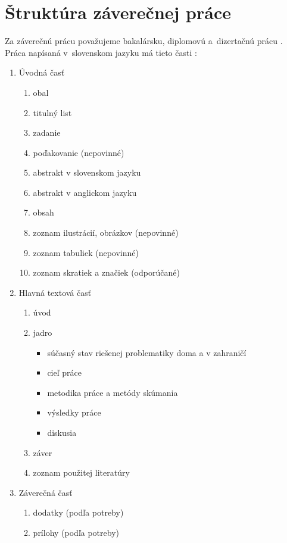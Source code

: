 \section{Štruktúra záverečnej práce}\label{sec:StrukturaPrace}
Za záverečnú prácu považujeme bakalársku, diplomovú
a~dizertačnú prácu \cite{zakon1312002}.
Práca napísaná v~slovenskom jazyku má tieto časti \cite{vyhlaska2332011, usmernenie562011}:
\begin{enumerate}
    \item Úvodná časť
    \begin{enumerate}
        \item obal
        \item titulný list
        \item zadanie
        \item poďakovanie (nepovinné)
        \item abstrakt v slovenskom jazyku
        \item abstrakt v anglickom jazyku
        \item obsah
        \item zoznam ilustrácií, obrázkov (nepovinné)
        \item zoznam tabuliek (nepovinné)
        \item zoznam skratiek a značiek (odporúčané)
    \end{enumerate}
    \item Hlavná textová časť
    \begin{enumerate}
        \item úvod
        \item jadro
        \begin{itemize}
            \item súčasný stav riešenej problematiky doma a v zahraničí
            \item cieľ práce
            \item metodika práce a metódy skúmania
            \item výsledky práce
            \item diskusia
        \end{itemize}
        \item záver
        \item zoznam použitej literatúry
    \end{enumerate}
    \item Záverečná časť
    \begin{enumerate}
        \item dodatky (podľa potreby)
        \item prílohy (podľa potreby)
    \end{enumerate}
\end{enumerate}

